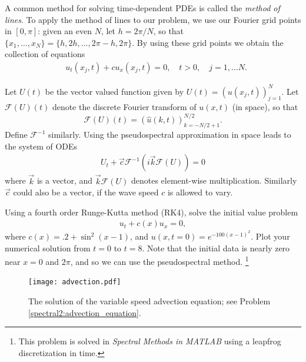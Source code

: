 A common method for solving time-dependent PDEs is called the \textit{method of lines}. To apply the method of lines to our problem, we use our Fourier grid points in $[0,\pi]$: given an even $N$, let $h = 2\pi/N$, so that $\{x_1,\ldots,x_N\} = \{h,2h,\ldots,2\pi-h,2\pi\}$.  By using these grid points we obtain the collection of equations
\begin{align}
&{ }u_t(x_j,t) + cu_x(x_j,t) = 0, \quad t >0, \quad j = 1, \ldots N. \label{spectral2:method_oflines}
\end{align}

Let $U(t)$ be the vector valued function given by $U(t) = (u(x_j,t))_{j=1}^N$.
Let $\mathcal{F}(U)(t)$ denote the discrete Fourier transform of $u(x,t)$ (in space), so that 
\[
\mathcal{F}(U)(t) = (\hat{u}(k,t))_{k=-N/2+1}^{N/2}.
\]
Define $\mathcal{F}^{-1}$ similarly.
Using the pseudospectral approximation in space leads to the system of ODEs
\begin{align}
	U_t +  \vec{c}\mathcal{F}^{-1}\left(i\vec{k}\mathcal{F}(U) \right) = 0
\end{align}
where $\vec{k}$ is a vector, and $\vec{k}\mathcal{F}(U) $ denotes element-wise multiplication. 
Similarly $\vec{c}$ could also be a vector, if the wave speed $c$ is allowed to vary. 


\begin{problem}
	Using a fourth order Runge-Kutta method (RK4), solve the initial value problem 
	\begin{align}
		u_t +c(x) u_x = 0,
	\end{align}
	where $c(x) = .2 + \sin^2(x-1)$, and $u(x,t=0) = e^{-100(x-1)^2}.$  Plot your numerical solution from $t = 0$ to $t = 8$.  Note that the initial data is nearly zero near $x = 0$ and  $2 \pi$, and so we can use the pseudospectral method. \footnote{This problem is solved in \textit{Spectral Methods in MATLAB} using a leapfrog discretization in time. } 
	\label{spectral2:advection_equation}
\end{problem}



\begin{figure}
\centering
\texttt{[image: advection.pdf]}
\caption{The solution of the variable speed advection equation; see Problem  \ref{spectral2:advection_equation}.}
\label{fig:spectral:spectral2_advection}
\end{figure}





